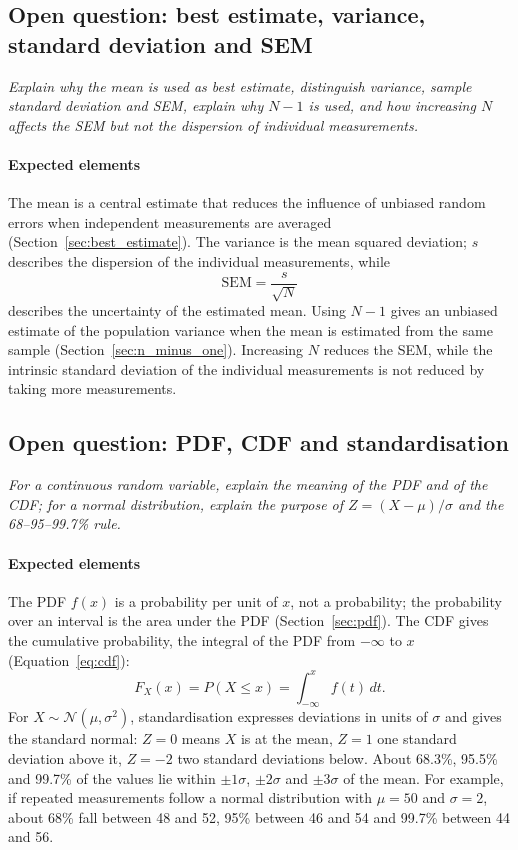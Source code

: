 \subsection{Open question: best estimate, variance, standard deviation and SEM}

\emph{Explain why the mean is used as best estimate, distinguish variance, sample standard deviation and SEM, explain why $N - 1$ is used, and how increasing $N$ affects the SEM but not the dispersion of individual measurements.}

\paragraph{Expected elements} The mean is a central estimate that reduces the influence of unbiased random errors when independent measurements are averaged (Section~\ref{sec:best_estimate}). The variance is the mean squared deviation; $s$ describes the dispersion of the individual measurements, while
\begin{equation*}
\text{SEM} = \frac{s}{\sqrt{N}}
\end{equation*}
describes the uncertainty of the estimated mean. Using $N - 1$ gives an unbiased estimate of the population variance when the mean is estimated from the same sample (Section~\ref{sec:n_minus_one}). Increasing $N$ reduces the SEM, while the intrinsic standard deviation of the individual measurements is not reduced by taking more measurements.

\subsection{Open question: PDF, CDF and standardisation}

\emph{For a continuous random variable, explain the meaning of the PDF and of the CDF; for a normal distribution, explain the purpose of $Z = (X - \mu)/\sigma$ and the 68--95--99.7\% rule.}

\paragraph{Expected elements} The PDF $f(x)$ is a probability per unit of $x$, not a probability; the probability over an interval is the area under the PDF (Section~\ref{sec:pdf}). The CDF gives the cumulative probability, the integral of the PDF from $-\infty$ to $x$ (Equation~\eqref{eq:cdf}):
\begin{equation*}
F_X(x) = P(X \le x) = \int_{-\infty}^{x}f(t)\,dt.
\end{equation*}
For $X \sim \mathcal{N}(\mu, \sigma^2)$, standardisation expresses deviations in units of $\sigma$ and gives the standard normal: $Z = 0$ means $X$ is at the mean, $Z = 1$ one standard deviation above it, $Z = -2$ two standard deviations below. About 68.3\%, 95.5\% and 99.7\% of the values lie within $\pm1\sigma$, $\pm2\sigma$ and $\pm3\sigma$ of the mean. For example, if repeated measurements follow a normal distribution with $\mu = 50$ and $\sigma = 2$, about 68\% fall between 48 and 52, 95\% between 46 and 54 and 99.7\% between 44 and 56.


